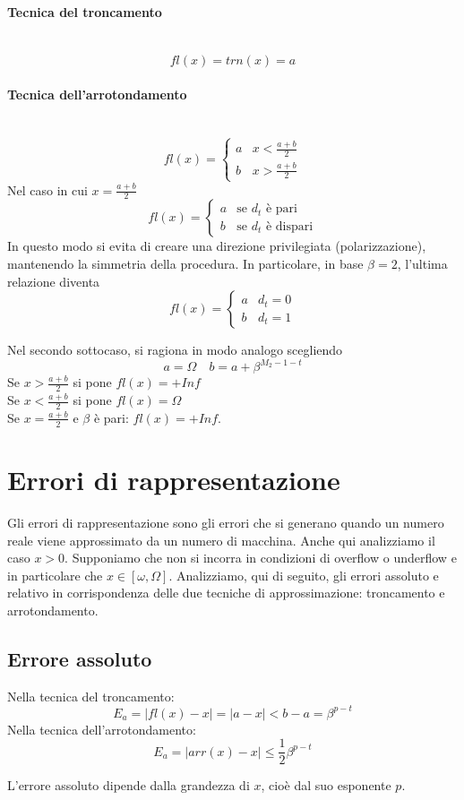\documentclass[12pt]{report}
\begin{document}
\begin{enumerate}
	\paragraph{Tecnica del troncamento} \quad \\
	\[
	fl(x) = trn(x) = a
	\]
	\paragraph{Tecnica dell'arrotondamento} \quad \\
	\[
	fl(x) = \begin{cases}
		a & x < \frac{a+b}{2} \\
		b & x > \frac{a+b}{2}
	\end{cases}
	\]
	Nel caso in cui $x = \frac{a+b}{2}$
	\[
	fl(x) = \begin{cases}
		a & \text{se $d_t$ è pari} \\
		b & \text{se $d_t$ è dispari}
	\end{cases}
	\]
	In questo modo si evita di creare una direzione privilegiata (polarizzazione), mantenendo la simmetria della procedura. In particolare, in base $\beta = 2$, l'ultima relazione diventa
	\[
	fl(x) = \begin{cases}
		a & d_t = 0 \\
		b & d_t = 1
	\end{cases}
	\]
\end{enumerate}
\begin{note}{}{}
	Nel secondo sottocaso, si ragiona in modo analogo scegliendo
	\[
	a = \Omega \quad b = a + \beta^{M_2 - 1 - t}
	\]
	Se $x > \frac{a+b}{2}$ si pone $fl(x) = +Inf$ \\
	Se $x < \frac{a+b}{2}$ si pone $fl(x) = \Omega$ \\
	Se $x = \frac{a+b}{2}$ e $\beta$ è pari: $fl(x) = +Inf$.
\end{note}
\section{Errori di rappresentazione}
Gli errori di rappresentazione sono gli errori che si generano quando un numero reale viene approssimato da un numero di macchina. Anche qui analizziamo il caso $x > 0$. Supponiamo che non si incorra in condizioni di overflow o underflow e in particolare che $x\in[\omega, \Omega]$. Analizziamo, qui di seguito, gli errori assoluto e relativo in corrispondenza delle due tecniche di approssimazione: troncamento e arrotondamento. \\
\subsection{Errore assoluto}
Nella tecnica del troncamento:
\[
E_a = |fl(x) - x| = |a - x| < b - a = \beta^{p-t}
\]
Nella tecnica dell'arrotondamento:
\[
E_a = |arr(x) - x| \leq \frac{1}{2}\beta^{p-t}
\]
\begin{note}{}{}
	L'errore assoluto dipende dalla grandezza di $x$, cioè dal suo esponente $p$.
\end{note}
\end{document}
